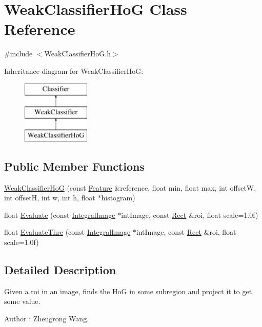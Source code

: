 \hypertarget{classWeakClassifierHoG}{}\section{Weak\+Classifier\+Ho\+G Class Reference}
\label{classWeakClassifierHoG}


{\ttfamily \#include $<$Weak\+Classifier\+Ho\+G.\+h$>$}

Inheritance diagram for Weak\+Classifier\+Ho\+G\+:\begin{figure}[H]
\begin{center}
\leavevmode
\includegraphics[height=3.000000cm]{classWeakClassifierHoG}
\end{center}
\end{figure}
\subsection*{Public Member Functions}
\begin{DoxyCompactItemize}
\item 
\hyperlink{classWeakClassifierHoG_a1355cfb6af523b56b52ff27b88eb066c}{Weak\+Classifier\+Ho\+G} (const \hyperlink{classFeature}{Feature} \&reference, float min, float max, int offset\+W, int offset\+H, int w, int h, float $\ast$histogram)
\item 
float \hyperlink{classWeakClassifierHoG_aef5482b7842e91410c9186c242ee0d6b}{Evaluate} (const \hyperlink{classIntegralImage}{Integral\+Image} $\ast$int\+Image, const \hyperlink{classRect}{Rect} \&roi, float scale=1.\+0f)
\item 
float \hyperlink{classWeakClassifierHoG_a5b0ecb768ced4b91d1bb0ddf214f4ac6}{Evaluate\+Thre} (const \hyperlink{classIntegralImage}{Integral\+Image} $\ast$int\+Image, const \hyperlink{classRect}{Rect} \&roi, float scale=1.\+0f)
\end{DoxyCompactItemize}


\subsection{Detailed Description}
Given a roi in an image, finds the Ho\+G in some subregion and project it to get some value. \begin{DoxyAuthor}{Author}
\+: Zhengrong Wang. 
\end{DoxyAuthor}


